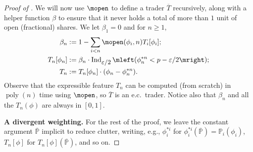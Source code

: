 \documentclass[authordate,onecolumn,noenvironments]{miri-tech-article}
\numberwithin{equation}{subsection}
\newcommand{\seq}[1]{{\overline{#1}}}
\newcommand{\poly}{\operatorname{poly}}
\newcommand{\nn}{n}
\newcommand{\ec}[1][\ ]{e.c.#1}
\newcommand{\tinysection}[1]{\medskip\noindent\textbf{#1.}}
\newcommand{\trade}{T}%
\newcommand{\Trader}{\seq{\trade}} %
\newcommand{\strat}{T} %
\newcommand{\BelState}{\mathbb{P}}
\newcommand{\pt}{\BelState}
\newcommand{\MP}{\seq{\pt}}
\newcommand{\ctsind}[1]{\operatorname{Ind}_{\text{\small{${#1}$}}}} %
\begin{document}
\begin{proof}[Proof of ]
  We will now use $\mopen$ to define a trader $\Trader$ recursively, along with a helper function $\beta$ to ensure that it never holds a total of more than $1$ unit of open (fractional) shares.  We let $\beta_1= 0$ and for $\nn\geq 1$,
  \begin{align*}
    \beta_\nn &:= 1- \sum_{i<\nn} \mopen(\phi_i, \nn) \strat_i[\phi_i];\\
    \strat_\nn[\phi_\nn] &:= \beta_\nn \cdot \ctsind{\varepsilon/2}\mleft(\phi_{\nn}^{*\nn} < p -\varepsilon /2\mright);\\
    \strat_\nn &:= \strat_\nn[\phi_n]\cdot(\phi_\nn - \phi_{\nn}^{*\nn}).
  \end{align*}
  Observe that the expressible feature $\strat_\nn$ can be computed (from scratch) in $\poly(\nn)$ time using $\mopen$, so $\Trader$ is an \ec trader. Notice also that $\beta_\nn$ and all the $\strat_\nn(\phi)$ are always in $[0,1]$.


  \tinysection{A divergent weighting}
  For the rest of the proof, we leave the constant argument $\MP$ implicit to reduce clutter, writing, e.g., $\phi_{i}^{*i}$ for $\phi_{i}^{*i}(\MP) = \pt_i(\phi_i)$, $\strat_\nn[\phi]$ for $\strat_\nn[\phi](\MP)$, and so on.


\end{proof}
\end{document}
